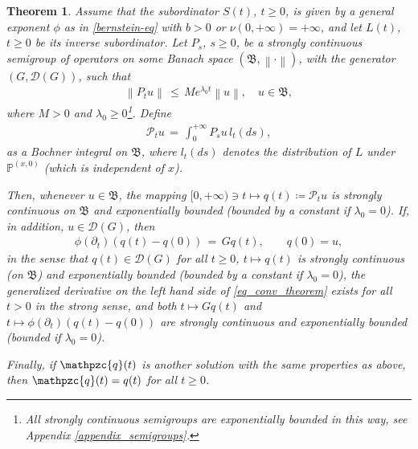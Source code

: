 \documentclass[reqno]{amsart}
\newtheorem{theorem}{Theorem}[section] %
\theoremstyle{remark}
\numberwithin{equation}{section} %
\newcommand{\PP}{\mathds{P}}
\newcommand{\DD}{\mathcal{D}}
\newcommand{\1}{\mathds{1}}
\begin{document}
	\begin{theorem}
		\label{theorem_convolution}
		Assume that the subordinator $S(t)$, $t\ge0$, is given by a general exponent $\phi$ as in \eqref{bernstein-eq} with $b>0$ or $\nu(0,+\infty)=+\infty$, and let $L(t)$, $t \geq 0$ be its inverse subordinator. Let $P_s$, $s \geq 0$, be a strongly continuous semigroup of operators on some Banach space $(\mathfrak{B}, \left\| \cdot \right\|)$, with the generator $(G,\DD(G))$, {such that}
		\begin{align}
			\left\| P_t u \right\| \, \leq \, M e^{\lambda_0 t} \left\| u \right\|, \quad {u \in \mathfrak{B},}
		\end{align}
		{where $M>0$ and $\lambda_0\ge0$}\footnote{{All strongly continuous semigroups are exponentially bounded in this way, see Appendix \ref{appendix_semigroups}.}}. Define
		\begin{align}
			\mathcal{P}_tu \, = \, \int_0^{+\infty} P_su \, l_t(ds),
		\end{align}
		as a Bochner integral on $\mathfrak{B}$, where $l_t(ds)$  denotes the distribution of $L$ under $\PP^{(x,0)}$ (which is independent of $x$).
		
		Then, whenever $u \in \mathfrak{B}$, the mapping $[0,+\infty)\ni t \mapsto q(t) \coloneqq \mathcal{P}_tu$ is strongly continuous on $\mathfrak{B}$ and {exponentially} bounded ({bounded by a constant if $\lambda_0=0$}). If, in addition, $u \in \mathcal{D}(G)$, then
		\begin{align}
			\phi(\partial_t) (q(t)-q(0)) \, = \, G q(t), \qquad q(0) = u,
			\label{eq_conv_theorem}
		\end{align}
		in the sense that $q(t) \in \mathcal{D}(G)$ for all $t \geq 0$, $t \mapsto q(t)$ is strongly continuous (on $\mathfrak{B}$) and {exponentially} bounded {(bounded by a constant if $\lambda_0=0$)}, the generalized derivative on the left hand side of \eqref{eq_conv_theorem} exists for all $t > 0$ in the strong sense, and both $t \mapsto Gq(t)$ and $t \mapsto \phi(\partial_t) (q(t)-q(0))$ are strongly continuous and {exponentially} bounded {(bounded if $\lambda_0=0$)}.
		
		Finally, if $\mathpzc{q}(t)$ is another solution with the same properties as above, then $\mathpzc{q}(t) = q(t)$ for all $t \geq 0$.
	\end{theorem}
\end{document}
